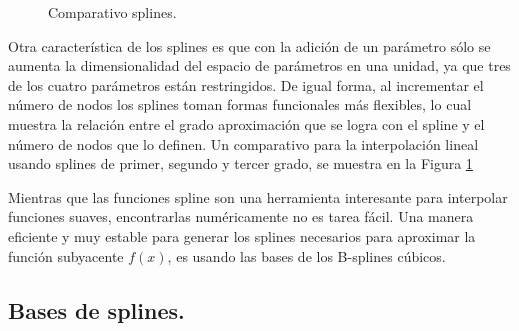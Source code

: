 \begin{figure}[h]
\caption{Comparativo splines.}
\label{spline_4}
\end{figure}


\hspace{0.4cm} Otra caracter\'istica de los splines es que con la adici\'on de un par\'ametro s\'olo se aumenta la dimensionalidad del espacio de par\'ametros en una unidad, ya que tres de los cuatro par\'ametros est\'an restringidos. De igual forma, al incrementar el n\'umero de nodos los splines toman formas funcionales m\'as flexibles, lo cual muestra la relaci\'on entre el grado aproximaci\'on que se logra con el spline y el n\'umero de nodos que lo definen. Un comparativo para la interpolaci\'on lineal usando splines de primer, segundo y tercer grado, se muestra en la Figura \ref{spline_4}


\hspace{0.4cm} Mientras que las funciones spline son una herramienta interesante para interpolar funciones suaves, encontrarlas num\'ericamente no es tarea f\'acil. Una manera eficiente y muy estable para generar los splines necesarios para aproximar la funci\'on subyacente $f(x)$, es usando las bases de los B-splines c\'ubicos.


\subsection{Bases de splines.\\}

